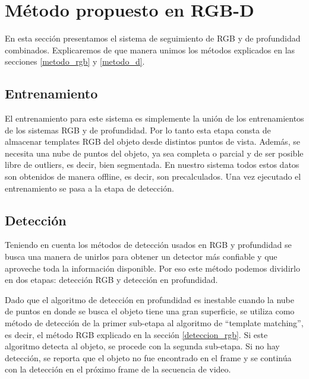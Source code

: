 \section{Método propuesto en RGB-D}\label{metodo_rgbd}
En esta sección presentamos el sistema de seguimiento de RGB y de profundidad combinados. Explicaremos de que manera unimos los métodos explicados en las secciones \ref{metodo_rgb} y \ref{metodo_d}.

\subsection{Entrenamiento}
El entrenamiento para este sistema es simplemente la unión de los entrenamientos de los sistemas RGB y de profundidad. Por lo tanto esta etapa consta de almacenar templates RGB del objeto desde distintos puntos de vista. Además, se necesita una nube de puntos del objeto, ya sea completa o parcial y de ser posible libre de outliers, es decir, bien segmentada. En nuestro sistema todos estos datos son obtenidos de manera offline, es decir, son precalculados. Una vez ejecutado el entrenamiento se pasa a la etapa de detección.

\subsection{Detección}
Teniendo en cuenta los métodos de detección usados en RGB y profundidad se busca una manera de unirlos para obtener un detector más confiable y que aproveche toda la información disponible. Por eso este método podemos dividirlo en dos etapas: detección RGB y detección en profundidad.

Dado que el algoritmo de detección en profundidad es inestable cuando la nube de puntos en donde se busca el objeto tiene una gran superficie, se utiliza como método de detección de la primer sub-etapa al algoritmo de ``template matching'', es decir, el método RGB explicado en la sección \ref{deteccion_rgb}. Si este algoritmo detecta al objeto, se procede con la segunda sub-etapa. Si no hay detección, se reporta que el objeto no fue encontrado en el frame y se continúa con la detección en el próximo frame de la secuencia de video.

